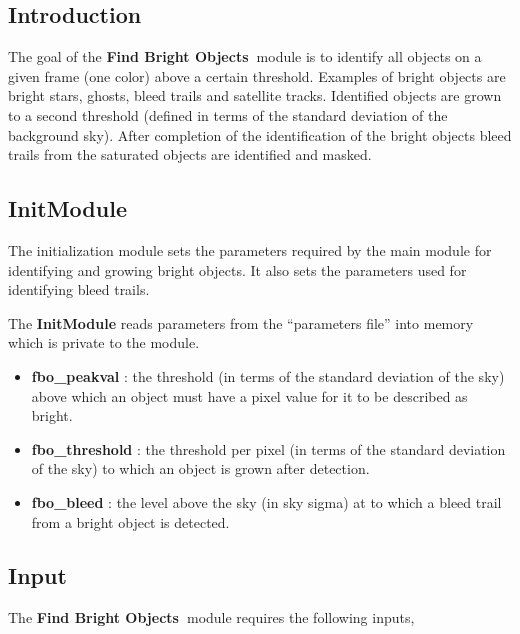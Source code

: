 \def \bom{{\bf Find Bright Objects\ }}  
 
\subsection {Introduction}
 
The goal of the \bom module is to identify all objects on a given
frame (one color) above a certain threshold. Examples of bright
objects are bright stars, ghosts, bleed trails and satellite
tracks. Identified objects are grown to a second threshold (defined in
terms of the standard deviation of the background sky). After
completion of the identification of the bright objects bleed trails
from the saturated objects are identified and masked.
 
\subsection {InitModule}
 
The initialization module sets the parameters required by the main
module for identifying and growing bright objects. It also sets the
parameters used for identifying bleed trails.
 
The {\bf InitModule} reads parameters from the ``parameters file''
into memory which is private to the module.  
 
\begin{itemize}
 
  \item {\bf fbo\_peakval} : the threshold (in terms of the standard
deviation of the sky) above which an object must have a pixel value for
it to be described as bright.
 
  \item {\bf fbo\_threshold} : the threshold per pixel (in terms of the
standard deviation of the sky) to which an object is grown after detection.
 
  \item {\bf fbo\_bleed} : the level above the sky (in sky sigma) at
to which a bleed trail from a bright object is detected.
 
\end{itemize}
 
\subsection{Input}
 
The \bom module requires the following inputs,
 
